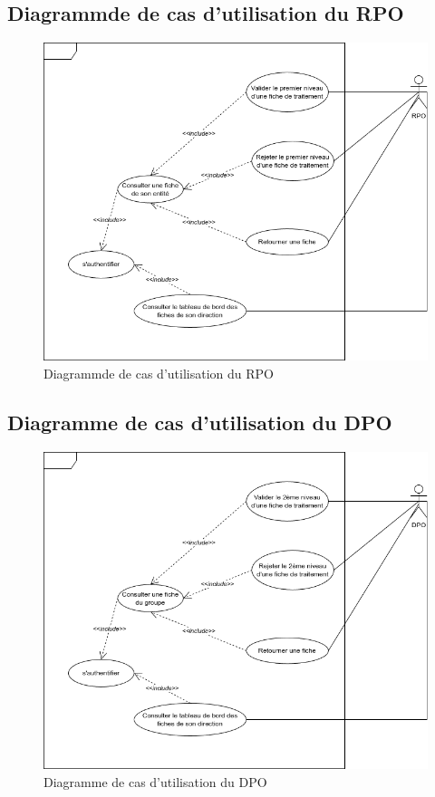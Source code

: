 \clearpage


\subsection{Diagrammde de cas d'utilisation du RPO}

\begin{figure}[H]
    \centering
    \includegraphics[width=\textwidth]{images/cas-utilisation-rpo.png}
    \caption{Diagrammde de cas d'utilisation du RPO}
\end{figure}

\clearpage

\subsection{Diagramme de cas d'utilisation du DPO}

\begin{figure}[H]
    \centering
    \includegraphics[width=\textwidth]{images/cas-utilisation-dpo.png}
    \caption{Diagramme de cas d'utilisation du DPO}
\end{figure}

